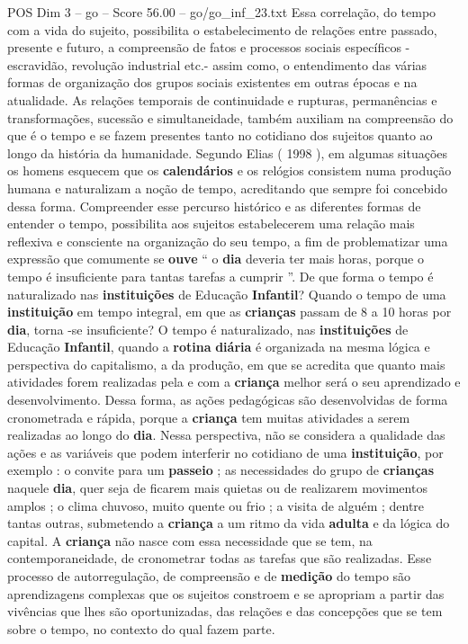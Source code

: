 \begin{textsample}{POS Dim 3 – go – Score 56.00 – go/go\_inf\_23.txt}
Essa correlação, do tempo com a vida do sujeito, possibilita o estabelecimento de relações entre passado, presente e futuro, a compreensão de fatos e processos sociais específicos - escravidão, revolução industrial etc.- assim como, o entendimento das várias formas de organização dos grupos sociais existentes em outras épocas e na atualidade.
As relações temporais de continuidade e rupturas, permanências e transformações, sucessão e simultaneidade, também auxiliam na compreensão do que é o tempo e se fazem presentes tanto no cotidiano dos sujeitos quanto ao longo da história da humanidade.
Segundo Elias ( 1998 ), em algumas situações os homens esquecem que os \textbf{calendários} e os relógios consistem numa produção humana e naturalizam a noção de tempo, acreditando que sempre foi concebido dessa forma.
Compreender esse percurso histórico e as diferentes formas de entender o tempo, possibilita aos sujeitos estabelecerem uma relação mais reflexiva e consciente na organização do seu tempo, a fim de problematizar uma expressão que comumente se \textbf{ouve} “ o \textbf{dia} deveria ter mais horas, porque o tempo é insuficiente para tantas tarefas a cumprir ”.
De que forma o tempo é naturalizado nas \textbf{instituições} de Educação \textbf{Infantil}?
Quando o tempo de uma \textbf{instituição} em tempo integral, em que as \textbf{crianças} passam de 8 a 10 horas por \textbf{dia}, torna -se insuficiente?
O tempo é naturalizado, nas \textbf{instituições} de Educação \textbf{Infantil}, quando a \textbf{rotina} \textbf{diária} é organizada na mesma lógica e perspectiva do capitalismo, a da produção, em que se acredita que quanto mais atividades forem realizadas pela e com a \textbf{criança} melhor será o seu aprendizado e desenvolvimento.
Dessa forma, as ações pedagógicas são desenvolvidas de forma cronometrada e rápida, porque a \textbf{criança} tem muitas atividades a serem realizadas ao longo do \textbf{dia}.
Nessa perspectiva, não se considera a qualidade das ações e as variáveis que podem interferir no cotidiano de uma \textbf{instituição}, por exemplo : o convite para um \textbf{passeio} ; as necessidades do grupo de \textbf{crianças} naquele \textbf{dia}, quer seja de ficarem mais quietas ou de realizarem movimentos amplos ; o clima chuvoso, muito quente ou frio ; a visita de alguém ; dentre tantas outras, submetendo a \textbf{criança} a um ritmo da vida \textbf{adulta} e da lógica do capital.
A \textbf{criança} não nasce com essa necessidade que se tem, na contemporaneidade, de cronometrar todas as tarefas que são realizadas.
Esse processo de autorregulação, de compreensão e de \textbf{medição} do tempo são aprendizagens complexas que os sujeitos constroem e se apropriam a partir das vivências que lhes são oportunizadas, das relações e das concepções que se tem sobre o tempo, no contexto do qual fazem parte.

\end{textsample}
